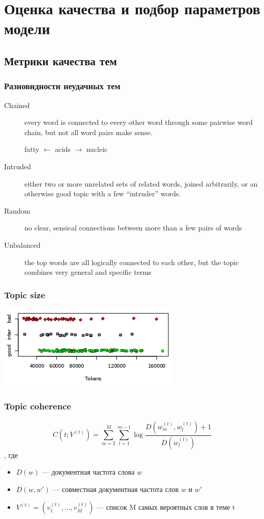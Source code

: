\documentclass[10pt,svgnames]{beamer}
\begin{document}
\section{Оценка качества и подбор параметров модели}

\subsection{Метрики качества тем}

\begin{frame}
  \frametitle{Разновидности неудачных тем}
  \begin{description}
  \item[Chained] every word is connected to every other word through
    some pairwise word chain, but not all word pairs make sense.

    \alert{fatty $\leftarrow$ acids $\rightarrow$ nucleic}
  \item[Intruded] either two or more unrelated sets of related words,
    joined arbitrarily, or an otherwise good topic with a few
    “intruder” words.
  \item[Random] no clear, sensical connections between more than a few
    pairs of words
  \item[Unbalanced] the top words are all logically connected to each
    other, but the topic combines very general and specific terms
  \end{description}
\end{frame}

\begin{frame}
  \frametitle{Topic size}
  \includegraphics[width=\textwidth]{topicsize}
\end{frame}

\begin{frame}
  \frametitle{Topic coherence}
  $$
  C(t; V^{(t)}) =\sum_{m=2}^{M} \sum_{l=1}^{m-1} \log\frac{D(w_{m}^{(t)},w_{l}^{(t)})+1}{D(w_{l}^{(t)})}
  $$, где
  \begin{itemize}
  \item $D(w)$ — документная частота слова $w$
  \item $D(w,w')$ — совместная документная частота слов $w$ и $w'$
  \item $V^{(t)}=(v_1^{(t)},\dots, v_M^{(t)})$ — список M самых вероятных слов в теме t
  \end{itemize}
\end{frame}
\end{document}
